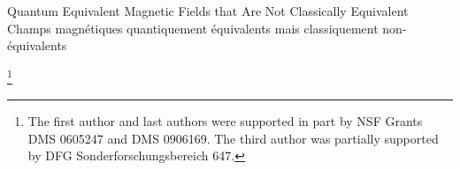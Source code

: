 \documentclass[12pt,leqno]{amsart}%
\theoremstyle{definition}
\theoremstyle{remark}
\numberwithin{equation}{section}
\begin{document}
\begin{title}{Quantum Equivalent Magnetic
Fields that Are Not Classically
Equivalent\\
Champs magn\'etiques quantiquement \'equivalents mais classiquement
non-\'equivalents}\end{title}

\author{Carolyn Gordon}
\address{Department of Mathematics, Dartmouth College, Hanover, NH  03755}
\thanks{The first author and last authors were supported in part by NSF Grants
DMS 0605247 and DMS 0906169.   The third author was partially supported by
DFG Sonderforschungsbereich 647.}
\author{William D. Kirwin}
\address{CAMGSD, Departamento de Matematica,
Instituto Superior Tecnico,
Av. Rovisco Pais,
1049-001 Lisboa, PORTUGAL}

\author{Dorothee Schueth}
\address{Institut f\"ur Mathematik, Humboldt-Universit\"at zu
Berlin, D-10099 Berlin, Germany}

\author{David Webb}
\address{Department of Mathematics, Dartmouth College, Hanover, NH  03755}




\end{document}
